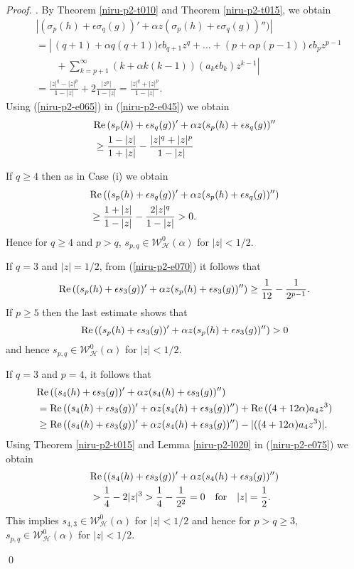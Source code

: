 \documentclass[a4paper,12pt]{amsart}
\theoremstyle{plain}
\theoremstyle{definition}
\newenvironment{pf}[1][]{ \vskip 3mm
 \noindent
 \ifthenelse{\equal{#1}{}}  {{\slshape Proof. }}  {{\slshape #1.} } }{\qed\bigskip}
\begin{document}
\begin{pf}
By Theorem \ref{niru-p2-t010} and Theorem \ref{niru-p2-t015}, we obtain
\begin{align}\label{niru-p2-e065}
&|(\sigma_p(h) + \epsilon \sigma_q(g))' + \alpha z (\sigma_p(h) + \epsilon \sigma_q(g))'')|\\\nonumber
& = \left|\frac{}{}(q + 1)+ \alpha q (q+1)) \epsilon b_{q+1}z^q +...+ (p + \alpha p (p-1)) \epsilon b_p z^{p-1} \right.\\\nonumber
& \quad\quad + \left.\sum_{k = p+1}^{\infty} (k + \alpha k (k-1))(a_k \epsilon b_k)z^{k-1}\right| \\\nonumber
& = \frac{|z|^q - |z|^p}{1 - |z|} + 2\frac{|z^p|}{1 - |z|} = \frac{|z|^q + |z|^p}{1 - |z|}.
\end{align}
Using (\ref{niru-p2-e065}) in (\ref{niru-p2-e045}) we obtain
\begin{align}\label{niru-p2-e070}
&{\rm Re\,}(s_p(h) + \epsilon s_q(g))' + \alpha z (s_p(h) + \epsilon s_q(g))'' \\\nonumber
& \geq \frac{1-|z|}{1 + |z|} - \frac{|z|^q + |z|^p}{1 - |z|}
\end{align}

If $q \geq 4$  then as in  Case (i) we obtain 
\begin{align*}
&{\rm Re\,}((s_p(h) + \epsilon s_q(g))' + \alpha z (s_p(h) + \epsilon s_q(g))'')\\\nonumber
&\geq \frac{1 + |z|}{1 - |z|} - \frac{2 |z|^q}{1 - |z|} > 0.
\end{align*}
Hence for  $q \geq 4$ and $p > q$, $s_{p, q}\in\mathcal{W}^0_{\mathcal{H}}(\alpha)$ for $|z|< 1/2$.

If $q = 3$ and $|z| = 1/2$,  from (\ref{niru-p2-e070}) it follows that
$$
{\rm Re\,}((s_p(h) + \epsilon s_3(g))' + \alpha z (s_p(h) + \epsilon s_3(g))'') \geq \frac{1}{12} - \frac{1}{2^{p-1}}.
$$
If $p \geq 5$ then the last estimate shows that
$$
{\rm Re\,}((s_p(h) + \epsilon s_3(g))' + \alpha z (s_p(h) + \epsilon s_3(g))'') >0
$$
and hence $s_{p, q}\in\mathcal{W}^0_{\mathcal{H}}(\alpha)$ for $|z|< 1/2$.

If $q = 3$ and $p = 4$, it follows that
\begin{align}\label{niru-p2-e075}
&{\rm Re\,}((s_4(h) + \epsilon s_3(g))' + \alpha z (s_4(h) + \epsilon s_3(g))'')\\\nonumber
&= {\rm Re\,}((s_4(h) + \epsilon s_3(g))' + \alpha z (s_4(h) + \epsilon s_3(g))'') + {\rm Re\,}((4 + 12 \alpha) a_4 z^3)\\\nonumber
&\geq  {\rm Re\,}((s_4(h) + \epsilon s_3(g))' + \alpha z (s_4(h) + \epsilon s_3(g))'') - |((4 + 12 \alpha) a_4 z^3)|.
\end{align}
Using Theorem \ref{niru-p2-t015} and Lemma \ref{niru-p2-l020} in (\ref{niru-p2-e075}) we obtain
\begin{align*}
&{\rm Re\,}((s_4(h) + \epsilon s_3(g))' + \alpha z (s_4(h) + \epsilon s_3(g))'')\\
&>\frac{1}{4} -2 |z|^3 > \frac{1}{4} -\frac{1}{2^2} = 0 \quad \mbox{for} \quad |z|= \frac{1}{2}.
\end{align*}
This implies $s_{4, 3}\in\mathcal{W}^0_{\mathcal{H}}(\alpha)$ for $|z|< 1/2$ and hence for $p> q \geq 3$, $s_{p, q}\in\mathcal{W}^0_{\mathcal{H}}(\alpha)$ for $|z|< 1/2$.


\end{pf}
\end{document}
